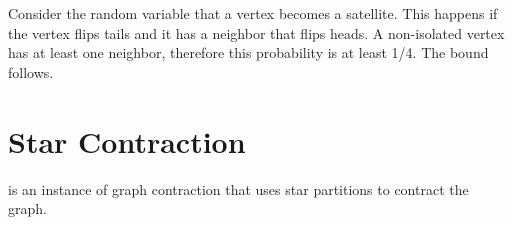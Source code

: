 \begin{teachnote}
Consider the random variable that a vertex becomes a satellite.  This
happens if the vertex flips tails and it has a neighbor that flips
heads.  A non-isolated vertex has at least one neighbor, therefore
this probability is at least 1/4.  The bound follows.
\end{teachnote}


\section{Star Contraction}
\label{sec:graphcon::star::contract}

\begin{definition}
\label{def:graphcon::star-contraction}
 is an instance of graph contraction that uses
star partitions to contract the graph.
\end{definition}

